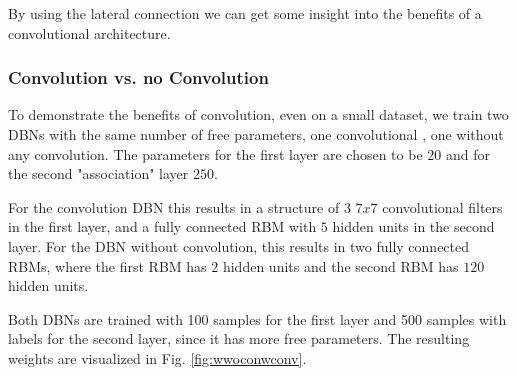 By using the lateral connection we can get some insight into the benefits of a convolutional architecture.

\subsubsection{Convolution vs. no Convolution} \label{c:convvsnoconvexp}

To demonstrate the benefits of convolution, even on a small dataset, we train two DBNs with the same number of free parameters, one convolutional , one without any convolution.
The parameters for the first layer are chosen to be $20$ and for the second "association" layer $250$.

For the convolution DBN this results in a structure of $3$ $7x7$ convolutional filters in the first layer, and a fully connected RBM with $5$ hidden units in the second layer.
For the DBN without convolution, this results in two fully connected RBMs, where the first RBM has $2$ hidden units and the second RBM has $120$ hidden units.

Both DBNs are trained with 100 samples for the first layer and 500 samples with labels for the second layer, since it has more free parameters.
The resulting weights are visualized in Fig. \ref{fig:wwoconwconv}.

